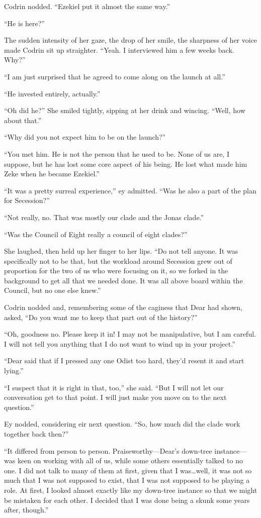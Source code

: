 Codrin nodded. ``Ezekiel put it almost the same way.''

``He is here?''

The sudden intensity of her gaze, the drop of her smile, the sharpness of her voice made Codrin sit up straighter. ``Yeah. I interviewed him a few weeks back. Why?''

``I am just surprised that he agreed to come along on the launch at all.''

``He invested entirely, actually.''

``Oh did he?'' She smiled tightly, sipping at her drink and wincing. ``Well, how about that.''

``Why did you not expect him to be on the launch?''

``You met him. He is not the person that he used to be. None of us are, I suppose, but he has lost some core aspect of his being. He lost what made him Zeke when he became Ezekiel.''

``It was a pretty surreal experience,'' ey admitted. ``Was he also a part of the plan for Secession?''

``Not really, no. That was mostly our clade and the Jonas clade.''

``Was the Council of Eight really a council of eight clades?''

She laughed, then held up her finger to her lips. ``Do not tell anyone. It was specifically not to be that, but the workload around Secession grew out of proportion for the two of us who were focusing on it, so we forked in the background to get all that we needed done. It was all above board within the Council, but no one else knew.''

Codrin nodded and, remembering some of the caginess that Dear had shown, asked, ``Do you want me to keep that part out of the history?''

``Oh, goodness no. Please keep it in! I may not be manipulative, but I am careful. I will not tell you anything that I do not want to wind up in your project.''

``Dear said that if I pressed any one Odist too hard, they'd resent it and start lying.''

``I suspect that it is right in that, too,'' she said. ``But I will not let our conversation get to that point. I will just make you move on to the next question.''

Ey nodded, considering eir next question. ``So, how much did the clade work together back then?''

``It differed from person to person. Praiseworthy---Dear's down-tree instance---was keen on working with all of us, while some others essentially talked to no one. I did not talk to many of them at first, given that I was\ldots well, it was not so much that I was not supposed to exist, that I was not supposed to be playing a role. At first, I looked almost exactly like my down-tree instance so that we might be mistaken for each other. I decided that I was done being a skunk some years after, though.''

